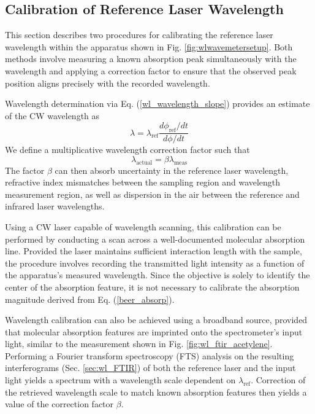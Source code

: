 \documentclass[8pt,a4paper]{report}
\begin{document}
	\subsection{Calibration of Reference Laser Wavelength} \label{sec:wl_ref_calibration}
	This section describes two procedures for calibrating the reference laser wavelength within the apparatus shown in Fig. \ref{fig:wlwavemetersetup}. Both methods involve measuring a known absorption peak simultaneously with the wavelength and applying a correction factor to ensure that the observed peak position aligns precisely with the recorded wavelength.
	
	Wavelength determination via Eq. (\ref{wl_wavelength_slope}) provides an estimate of the CW wavelength as
	\begin{equation}
		\lambda = \lambda_\mathrm{ref} \frac{d\phi_\mathrm{ref} / dt}{d\phi / dt}
	\end{equation}
	We define a multiplicative wavelength correction factor such that
	\begin{equation} \label{wl_correction_factor}
		\lambda_\mathrm{actual} = \beta \lambda_\mathrm{meas}
	\end{equation}
	The factor $\beta$ can then absorb uncertainty in the reference laser wavelength, refractive index mismatches between the sampling region and wavelength measurement region, as well as dispersion in the air between the reference and infrared laser wavelengths.
	
	Using a CW laser capable of wavelength scanning, this calibration can be performed by conducting a scan across a well-documented molecular absorption line. Provided the laser maintains sufficient interaction length with the sample, the procedure involves recording the transmitted light intensity as a function of the apparatus's measured wavelength. Since the objective is solely to identify the center of the absorption feature, it is not necessary to calibrate the absorption magnitude derived from Eq. (\ref{beer_absorp}).
	
	Wavelength calibration can also be achieved using a broadband source, provided that molecular absorption features are imprinted onto the spectrometer's input light, similar to the measurement shown in Fig. \ref{fig:wl_ftir_acetylene}. Performing a Fourier transform spectroscopy (FTS) analysis on the resulting interferograms (Sec. \ref{sec:wl_FTIR}) of both the reference laser and the input light yields a spectrum with a wavelength scale dependent on $\lambda_\mathrm{ref}$. Correction of the retrieved wavelength scale to match known absorption features then yields a value of the correction factor $\beta$.
	
\end{document}
